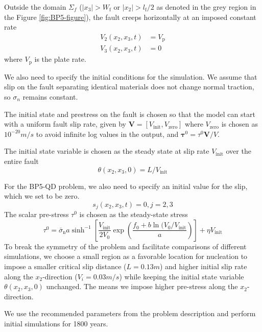 Outside the domain $\Sigma_f$ ($|x_3| > W_\text{f}$ or $|x_2| > l_\text{f} / 2$ as denoted in the grey region in the Figure \ref{fig:BP5-figure}), the fault creeps horizontally at an imposed constant rate
\begin{align}
    V_2(x_2, x_3, t) &= V_\text{p} \\
    V_3(x_2, x_3, t) &= 0
\end{align}
where $V_\text{p}$ is the plate rate.

We also need to specify the initial conditions for the simulation.
We assume that slip on the fault separating identical materials does not change normal traction, so $\sigma_n$ remains constant.

The initial state and prestress on the fault is chosen so that the model can start with a uniform fault slip rate, given by $\textbf{V} = [V_\text{init}, V_\text{zero}]$ where $V_\text{zero}$ is chosen as $10^{-20}m/s$ to avoid infinite log values in the output, and $\boldsymbol{\tau}^0 = \tau^0 \textbf{V} / V$.

The initial state variable is chosen as the steady state at slip rate $V_\text{init}$ over the entire fault 
\begin{equation}
    \theta(x_2, x_3, 0) = L / V_\text{init}
\end{equation}

For the BP5-QD problem, we also need to specify an initial value for the slip, which we set to be zero.
\begin{equation}
    s_j(x_2, x_3, t) = 0, j = 2, 3
\end{equation}
The scalar pre-stress $\tau^0$ is chosen as the steady-state stress
\begin{equation}
    \tau^0 = \bar{\sigma}_\text{n} a \sinh^{-1}[\frac{V_\text{init}}{2V_0}\exp(\frac{f_0 + b\ln(V_0/V_\text{init}}{a})] + \eta V_\text{init}
\end{equation}
To break the symmetry of the problem and facilitate comparisons of different simulations, we choose a small region as a favorable location for nucleation to impose a smaller critical slip distance ($L=0.13m$) and higher initial slip rate along the $x_2$-direction ($V_i = 0.03 m/s$) while keeping the initial state variable $\theta(x_2, x_3, 0)$ unchanged. The means we impose higher pre-stress along the $x_2$-direction.

We use the recommended parameters from the problem description and perform initial simulations for 1800 years.


